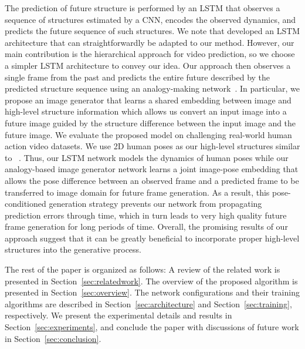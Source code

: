 \documentclass{article}
\begin{document}
The prediction of future structure is performed by an LSTM that observes a sequence of structures estimated by a CNN, encodes the observed dynamics, and predicts the future sequence of such structures.
We note that \citet{Fragkiadaki} developed an LSTM architecture that can straightforwardly be adapted to our method.
%
However, our main contribution is the hierarchical approach for video prediction, so we choose a simpler LSTM architecture to convey our idea.
%
Our approach then observes a single frame from the past and predicts the entire future described by the predicted structure sequence using an analogy-making network~\cite{reed2015deep}.
In particular, we propose an image generator that learns a shared embedding between image and high-level structure information which allows us convert an input image into a future image guided by the structure difference between the input image and the future image.
%
We evaluate the proposed model on challenging real-world human action video datasets.
%
We use 2D human poses as our high-level structures similar to ~\citet{reed2016learning}.
%
Thus, our LSTM network models the dynamics of human poses while our analogy-based image generator network learns a joint image-pose embedding that allows the pose difference between an observed frame and a predicted frame to be transferred to image domain for future frame generation.
%
As a result, this pose-conditioned generation strategy prevents our network from propagating prediction errors through time, which in turn leads to very high quality future frame generation for long periods of time. 
Overall, the promising results of our approach suggest that it can be greatly beneficial to incorporate proper high-level structures into the generative process. 


The rest of the paper is organized as follows:
A review of the related work is presented in Section~\ref{sec:relatedwork}.
The overview of the proposed algorithm is presented in Section~\ref{sec:overview}. 
The network configurations and their training algorithms are described in Section~\ref{sec:architecture} and Section~\ref{sec:training}, respectively.
We present the experimental details and results in Section~\ref{sec:experiments}, and conclude the paper with discussions of future work in Section~\ref{sec:conclusion}.
\end{document}
